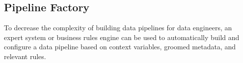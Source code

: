 \documentclass[a4paper,10pt, twoside,english]{sphinxmanual}
\begin{document}
\subsection{Pipeline Factory}
\label{\detokenize{pipeline/pipeline_factory:module-spooq2.pipeline.factory}}\label{\detokenize{pipeline/pipeline_factory:pipeline-factory}}\label{\detokenize{pipeline/pipeline_factory::doc}}
To decrease the complexity of building data pipelines for data engineers, an expert system or
business rules engine can be used to automatically build and configure a data pipeline based on
context variables, groomed metadata, and relevant rules.
\end{document}
